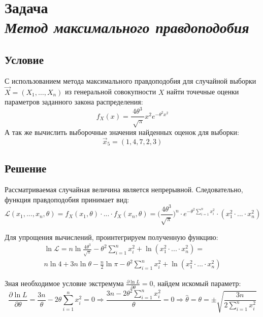 \section*{Задача \\\textit{Метод максимального правдоподобия}}

\subsection*{Условие}
\sloppy С использованием метода максимального правдоподобия для случайной выборки $\vec{X} = (X_1,\dots,X_n)$ из генеральной совокупности $X$ найти точечные оценки параметров заданного закона распределения:
\begin{equation*}
    f_X(x) = \frac{4\theta^3}{\sqrt[]{\pi}} x^2 e^{-\theta^2 x^2}
\end{equation*}
А так же вычислить выборочные значения найденных оценок для выборки:
\begin{equation*}
    \vec{x}_5 = (1, 4, 7, 2, 3)
\end{equation*}

\subsection*{Решение}
Рассматриваемая случайная величина является непрерывной. Следовательно, функция правдоподобия принимает вид:
\begin{equation*}
    \mathcal{L}({x}_1, ..., {x}_n, \theta) = f_X(x_1, \theta) \cdot ... \cdot f_X(x_n, \theta) = 
    \bigg(\frac{4 \theta^3}{\sqrt{\pi}}\bigg)^n \cdot e^{-\theta^2 \sum\limits_{i=1}^n{x_i^2}} \cdot (x_1^2 \cdot ... \cdot x_n^2)
\end{equation*}

Для упрощения вычислений, проинтегрируем полученную функцию:
\begin{eqnarray*}
    \ln \mathcal{L} = n \ln \frac{4 \theta^3}{\sqrt{\pi}} - \theta^2 \sum\limits_{i=1}^n{x_i^2} + \ln(x_1^2 \cdot ... \cdot x_n^2) = \\
    n \ln 4 + 3n \ln \theta - \frac{n}{2} \ln{\pi} - \theta^2 \sum\limits_{i=1}^n{x_i^2} + \ln(x_1^2 \cdot ... \cdot x_n^2)
\end{eqnarray*}

Зная необходимое условие экстремума $\frac{\partial \ln L}{\partial \theta} = 0$, найдем искомый параметр:
\begin{equation*}
    \frac{\partial \ln L}{\partial \theta} = \frac{3n}{\theta} - 2\theta \sum\limits_{i=1}^n{x_i^2} = 0 \Rightarrow \frac{3n - 2 \theta^2 \sum\limits_{i=1}^n{x_i^2}}{\theta} = 0 \Rightarrow 
    \hat{\theta} = \theta = \pm \sqrt{\frac{3n}{2 \sum\limits_{i = 1}^n{x_i^2}}}
\end{equation*}

